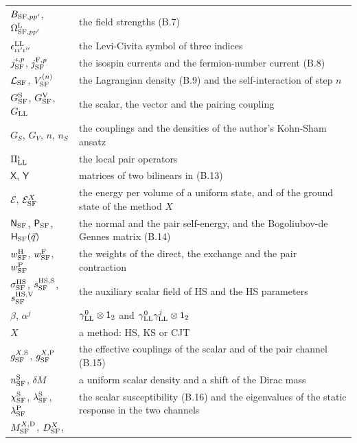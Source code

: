 \documentclass[
  10pt,
]{article}
\begin{document}
\begin{longtable}[]{@{}
  >{\raggedright\arraybackslash}p{}
  >{\raggedright\arraybackslash}p{}@{}}
\(B_{{\rm SF},pp'}\), \(\Omega^{\rm L}_{{\rm SF},pp'}\) & the field
strengths (B.7) \\
\(\epsilon^{\rm LL}_{\iota\iota'\iota''}\) & the Levi-Civita symbol of
three indices \\
\(j^{\iota,p}_{\rm SF}\), \(j^{{\rm F},p}_{\rm SF}\) & the isospin
currents and the fermion-number current (B.8) \\
\(\mathcal L_{\rm SF}\), \(V^{(n)}_{\rm SF}\) & the Lagrangian density
(B.9) and the self-interaction of step \(n\) \\
\(G^{\rm S}_{\rm SF}\), \(G^{\rm V}_{\rm SF}\), \(G_{\rm LL}\) & the
scalar, the vector and the pairing coupling \\
\(G_S\), \(G_V\), \(n\), \(n_S\) & the couplings and the densities of
the author's Kohn-Sham ansatz \\
\(\Pi^\iota_{\rm LL}\) & the local pair operators \\
\(\mathsf X\), \(\mathsf Y\) & matrices of two bilinears in (B.13) \\
\(\mathcal E\), \(\mathcal E^X_{\rm SF}\) & the energy per volume of a
uniform state, and of the ground state of the method \(X\) \\
\(\mathsf N_{\rm SF}\), \(\mathsf P_{\rm SF}\),
\(\mathsf H_{\rm SF}(\vec q)\) & the normal and the pair self-energy,
and the Bogoliubov-de Gennes matrix (B.14) \\
\(w^{\rm H}_{\rm SF}\), \(w^{\rm F}_{\rm SF}\), \(w^{\rm P}_{\rm SF}\) &
the weights of the direct, the exchange and the pair contraction \\
\(\sigma^{\rm HS}_{\rm SF}\), \(s^{\rm HS,S}_{\rm SF}\),
\(s^{\rm HS,V}_{\rm SF}\) & the auxiliary scalar field of HS and the HS
parameters \\
\(\beta\), \(\alpha^j\) & \(\gamma^0_{\rm LL}\otimes\mathsf 1_2\) and
\(\gamma^0_{\rm LL}\gamma^j_{\rm LL}\otimes\mathsf 1_2\) \\
\(X\) & a method: HS, KS or CJT \\
\(g^{X,{\rm S}}_{\rm SF}\), \(g^{X,{\rm P}}_{\rm SF}\) & the effective
couplings of the scalar and of the pair channel (B.15) \\
\(n^{\rm S}_{\rm SF}\), \(\delta M\) & a uniform scalar density and a
shift of the Dirac mass \\
\(\chi^{\rm S}_{\rm SF}\), \(\lambda^{\rm S}_{\rm SF}\),
\(\lambda^{\rm P}_{\rm SF}\) & the scalar susceptibility (B.16) and the
eigenvalues of the static response in the two channels \\
\(M^{X,{\rm D}}_{\rm SF}\), \(D^X_{\rm SF}\),

\end{longtable}
\end{document}
